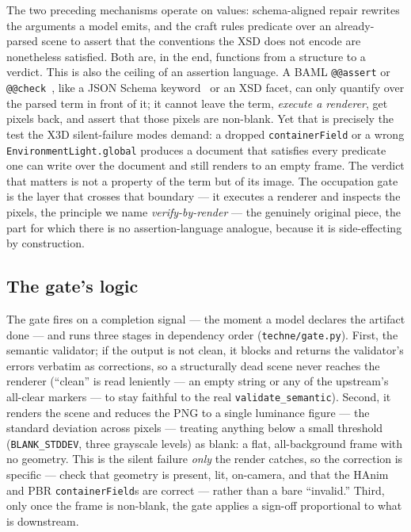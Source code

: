 \documentclass[sigconf,nonacm,screen,anonymous]{acmart}
\begin{document}
The two preceding mechanisms operate on values: schema-aligned repair rewrites the arguments a model emits, and the craft rules predicate over an already-parsed scene to assert that the conventions the XSD does not encode are nonetheless satisfied. Both are, in the end, functions from a structure to a verdict. This is also the ceiling of an assertion language. A BAML \texttt{@@assert} or \texttt{@@check}~\cite{baml}, like a JSON Schema keyword~\cite{jsonschema} or an XSD facet, can only quantify over the parsed term in front of it; it cannot leave the term, \emph{execute a renderer}, get pixels back, and assert that those pixels are non-blank. Yet that is precisely the test the X3D silent-failure modes demand: a dropped \texttt{containerField} or a wrong \texttt{EnvironmentLight.global} produces a document that satisfies every predicate one can write over the document and still renders to an empty frame. The verdict that matters is not a property of the term but of its image. The occupation gate is the layer that crosses that boundary --- it executes a renderer and inspects the pixels, the principle we name \emph{verify-by-render} --- the genuinely original piece, the part for which there is no assertion-language analogue, because it is side-effecting by construction.

\subsection{The gate's logic}

The gate fires on a completion signal --- the moment a model declares the artifact done --- and runs three stages in dependency order (\texttt{techne/gate.py}). First, the semantic validator; if the output is not clean, it blocks and returns the validator's errors verbatim as corrections, so a structurally dead scene never reaches the renderer (``clean'' is read leniently --- an empty string or any of the upstream's all-clear markers --- to stay faithful to the real \texttt{validate\_semantic}). Second, it renders the scene and reduces the PNG to a single luminance figure --- the standard deviation across pixels --- treating anything below a small threshold (\texttt{BLANK\_STDDEV}, three grayscale levels) as blank: a flat, all-background frame with no geometry. This is the silent failure \emph{only} the render catches, so the correction is specific --- check that geometry is present, lit, on-camera, and that the HAnim and PBR \texttt{containerField}s are correct --- rather than a bare ``invalid.'' Third, only once the frame is non-blank, the gate applies a sign-off proportional to what is downstream.
\end{document}
